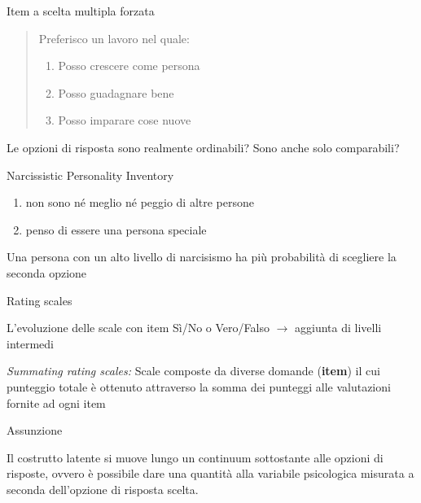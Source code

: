 \documentclass[compress]{beamer}
\begin{document}
\begin{frame}{Item a scelta multipla forzata}
	
	\begin{quote}
		
		Preferisco un lavoro nel quale: 
		
		\begin{enumerate}
			\item Posso crescere come persona
			\item Posso guadagnare bene
			\item Posso imparare cose nuove
		\end{enumerate}
	\end{quote}
	
		
	\vspace{2.5mm}
	Le opzioni di risposta sono realmente ordinabili? Sono anche solo comparabili?
	
	\pause
	\begin{exampleblock}{Narcissistic Personality Inventory}
		
		\pause
		\begin{enumerate}
			\item non sono né meglio né peggio di altre persone
			\item penso di essere una persona speciale 
		\end{enumerate}
		
		Una persona con un alto livello di narcisismo ha più probabilità di scegliere la seconda opzione
	\end{exampleblock}
\end{frame}

\begin{frame}{Rating scales}
	
	L'evoluzione delle scale con item Sì/No o Vero/Falso $\rightarrow$ aggiunta di livelli intermedi
	
	\emph{Summating rating scales:} Scale composte da diverse domande (\textbf{item}) il cui punteggio totale è ottenuto attraverso la somma dei punteggi alle valutazioni fornite ad ogni item
	
	\pause
	\begin{block}{Assunzione}
		
		Il costrutto latente si muove lungo un continuum sottostante alle opzioni di risposte, ovvero è possibile dare una quantità alla variabile psicologica misurata a seconda dell'opzione di risposta scelta. 
		\end{block}
		

\end{frame}
\end{document}
